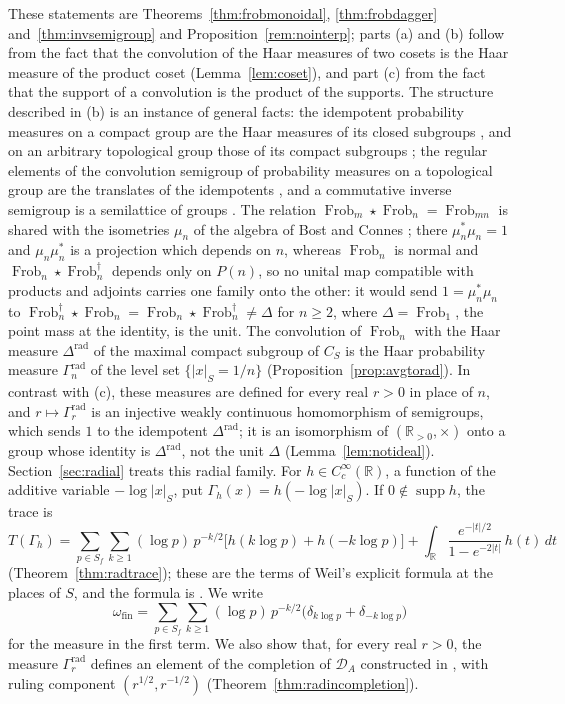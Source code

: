 \documentclass[11pt]{amsart}
\theoremstyle{definition}
\newcommand{\R}{\mathbb R}
\newcommand{\Frob}{\operatorname{Frob}}
\newcommand{\supp}{\operatorname{supp}}
\newcommand{\DA}{\mathcal D_A}
\begin{document}
These statements are Theorems~\ref{thm:frobmonoidal}, \ref{thm:frobdagger}
and~\ref{thm:invsemigroup} and Proposition~\ref{rem:nointerp}; parts (a) and (b) follow
from the fact that the convolution of the Haar measures of two cosets is the
Haar measure of the product coset (Lemma~\ref{lem:coset}), and part (c) from
the fact that the support of a convolution is the product of the supports.
The structure described in (b) is an instance of general facts: the
idempotent probability measures on a compact group are the Haar measures of
its closed subgroups \cite{Wendel}, and on an arbitrary topological group
those of its compact subgroups \cite[Proposition~2.2]{BCHR}; the
regular elements of the convolution semigroup of probability measures on a
topological group are the translates of the idempotents
\cite[Proposition~2.4]{BCHR}, and a commutative inverse semigroup is a
semilattice of groups \cite{Lawson}. The relation
$\Frob_m\star\Frob_n=\Frob_{mn}$ is shared with the isometries $\mu_n$ of
the algebra of Bost and Connes \cite{BostConnes}; there
$\mu_n^*\mu_n=1$ and $\mu_n\mu_n^*$ is a projection which depends on $n$,
whereas $\Frob_n$ is normal and $\Frob_n\star\Frob_n^\dagger$ depends only
on $P(n)$, so no unital map compatible with products and adjoints carries one
family onto the other: it would send $1=\mu_n^*\mu_n$ to
$\Frob_n^\dagger\star\Frob_n=\Frob_n\star\Frob_n^\dagger\ne\Delta$ for $n\ge2$, where $\Delta=\Frob_1$, the point mass at the identity, is the unit. The convolution
of $\Frob_n$ with the Haar measure $\Delta^{\mathrm{rad}}$ of the maximal
compact subgroup of $C_S$ is the Haar probability measure
$\Gamma_n^{\mathrm{rad}}$ of the level set $\{|x|_S=1/n\}$
(Proposition~\ref{prop:avgtorad}). In contrast with (c), these measures are
defined for every real $r>0$ in place of $n$, and
$r\mapsto\Gamma_r^{\mathrm{rad}}$ is an injective weakly continuous
homomorphism of semigroups, which sends $1$ to the idempotent
$\Delta^{\mathrm{rad}}$; it is an isomorphism of $(\R_{>0},\times)$ onto a
group whose identity is $\Delta^{\mathrm{rad}}$, not the unit $\Delta$ (Lemma~\ref{lem:notideal}).
Section~\ref{sec:radial} treats this radial family. For
$h\in C_c^\infty(\R)$, a function of the additive variable $-\log|x|_S$, put
$\Gamma_h(x)=h(-\log|x|_S)$. If $0\notin\supp h$, the trace is
\[
  T(\Gamma_h)=\sum_{p\in S_f}\sum_{k\ge1}(\log p)\,p^{-k/2}
    \bigl[h(k\log p)+h(-k\log p)\bigr]
   +\int_\R\frac{e^{-|t|/2}}{1-e^{-2|t|}}\,h(t)\,dt
\]
(Theorem~\ref{thm:radtrace}); these are the terms of Weil's explicit formula
\cite{Weil1952} at the places of $S$, and the formula is
\cite[(82), (32) and Lemma~A.1]{Companion}. We write
\[
  \omega_{\mathrm{fin}}=\sum_{p\in S_f}\sum_{k\ge1}(\log p)\,p^{-k/2}
    \bigl(\delta_{k\log p}+\delta_{-k\log p}\bigr)
\]
for the measure in the first term. We also show that, for every real $r>0$,
the measure $\Gamma_r^{\mathrm{rad}}$ defines an element of the completion
of $\DA$ constructed in \cite{Companion}, with ruling component
$(r^{1/2},r^{-1/2})$ (Theorem~\ref{thm:radincompletion}).
\end{document}
